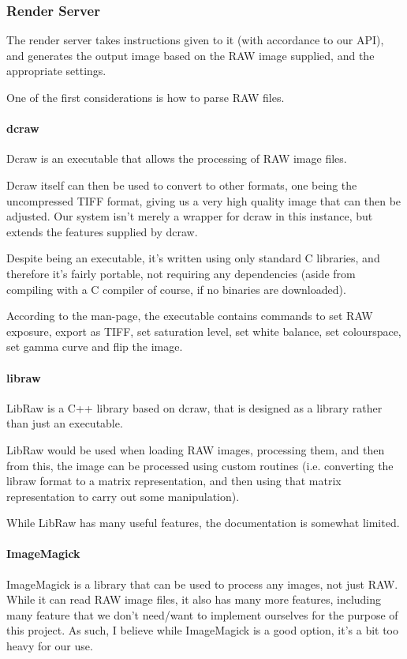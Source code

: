 \documentclass[12pt,a4paper]{article}
\begin{document}
\subsubsection{Render Server}
The render server takes instructions given to it (with accordance to our API), and
generates the output image based on the RAW image supplied, and the appropriate settings.

One of the first considerations is how to parse RAW files.

\paragraph{dcraw}
Dcraw is an executable that allows the processing of RAW image files.

Dcraw itself can then be used to convert to other formats, one being the uncompressed TIFF format,
giving us a very high quality image that can then be adjusted. Our system isn't merely a wrapper for
dcraw in this instance, but extends the features supplied by dcraw.

Despite being an executable, it's written using only standard C libraries, and therefore it's
fairly portable, not requiring any dependencies (aside from compiling with a C compiler of course, if
no binaries are downloaded). \cite{DcrawWebsite}

According to the man-page, the executable contains commands to set RAW exposure, export as TIFF,
set saturation level, set white balance, set colourspace, set gamma curve and flip the image. \cite{DcrawManpage}


\paragraph{libraw}
LibRaw is a C++ library based on dcraw, that is designed as a library rather than just
an executable.

LibRaw would be used when loading RAW images, processing them, and then from this,
the image can be processed using custom routines (i.e. converting the libraw format
to a matrix representation, and then using that matrix representation to carry out
some manipulation).

While LibRaw has many useful features, the documentation is somewhat limited.

\paragraph{ImageMagick}
ImageMagick is a library that can be used to process any images, not just RAW. While it can read
RAW image files, it also has many more features, including many feature that we don't need/want to
implement ourselves for the purpose of this project. As such, I believe while ImageMagick is a good option,
it's a bit too heavy for our use.
\end{document}
